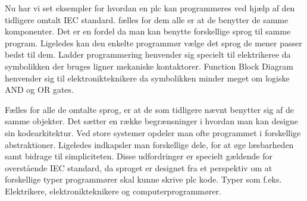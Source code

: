 
\noindent Nu har vi set eksempler for hvordan en plc kan programmeres ved hjælp af den tidligere omtalt IEC standard. fælles for dem alle er at de benytter de samme komponenter. Det er en fordel da man kan benytte forskellige sprog til samme program. Ligeledes kan den enkelte programmør vælge det sprog de mener passer bedst til dem. Ladder programmering henvender sig specielt til elektrikeree da symbolikken der bruges ligner mekaniske kontaktorer. Function Block Diagram henvender sig til elektronikteknikere da symbolikken minder meget om logiske AND og OR gates.

Fælles for alle de omtalte sprog, er at de som tidligere nævnt benytter sig af de samme objekter. Det sætter en række begrænsninger i hvordan man kan designe sin kodearkitektur. Ved store systemer opdeler man ofte programmet i forskellige abstraktioner. Ligeledes indkapsler man forskellige dele, for at øge læsbarheden samt bidrage til simpliciteten. Disse udfordringer er specielt gældende for overstående IEC standard, da sproget er designet fra et perspektiv om at forskellige typer programmører skal kunne skrive plc kode. Typer som f.eks. Elektrikere, elektronikteknikere og computerprogrammører.





